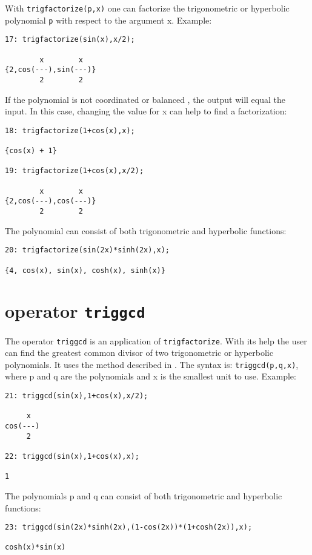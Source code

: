 With {\tt trigfactorize(p,x)} one can factorize the trigonometric or 
hyperbolic polynomial {\tt p} with respect to the argument x. Example:
{\small
\begin{verbatim}
17: trigfactorize(sin(x),x/2); 

        x        x
{2,cos(---),sin(---)}
        2        2
\end{verbatim}
}\noindent

If the polynomial is not coordinated or balanced \cite{art}, 
the output will equal the input.
In this case, changing the value for x can help to find a factorization:
{\small
\begin{verbatim}
18: trigfactorize(1+cos(x),x);

{cos(x) + 1}

19: trigfactorize(1+cos(x),x/2); 

        x        x
{2,cos(---),cos(---)}
        2        2
\end{verbatim}
}\noindent

The polynomial can consist of both trigonometric and hyperbolic functions:
{\small
\begin{verbatim}
20: trigfactorize(sin(2x)*sinh(2x),x);

{4, cos(x), sin(x), cosh(x), sinh(x)}
\end{verbatim}
}\noindent

\section{\REDUCE{} operator {\tt triggcd}}

The operator {\tt triggcd} is an application of {\tt trigfactorize}. 
With its help the user can find the greatest common divisor of two 
trigonometric or hyperbolic polynomials. It uses the method described 
in \cite{art}. The syntax is: {\tt triggcd(p,q,x)}, where p and q 
are the polynomials and x is the smallest unit to use. Example:

{\small
\begin{verbatim}
21: triggcd(sin(x),1+cos(x),x/2);

     x
cos(---)
     2 

22: triggcd(sin(x),1+cos(x),x);

1
\end{verbatim}
}\noindent

The polynomials p and q can consist of both trigonometric and hyperbolic 
functions:
{\small
\begin{verbatim}
23: triggcd(sin(2x)*sinh(2x),(1-cos(2x))*(1+cosh(2x)),x);

cosh(x)*sin(x)
\end{verbatim}
}\noindent


